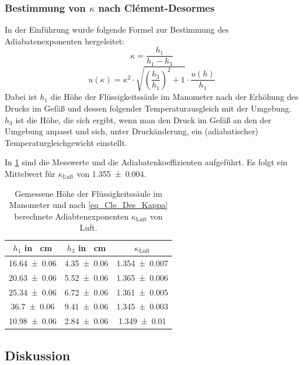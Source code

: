 \documentclass[
	a4paper,
	12pt,
	pagesize,
	ngerman
]{scrartcl}
\begin{document}
	
	
	\subsubsection{Bestimmung von $\kappa$ nach Clément-Desormes}
	In der Einführung wurde folgende Formel zur Bestimmung des Adiabatenexponenten hergeleitet:
	\begin{equation}
		\kappa = \frac{h_1}{h_1-h_3}
		\label{eq_Cle_Des_Kappa}
	\end{equation}
	\begin{equation}	
		u(\kappa) = \kappa^2\cdot \sqrt{\left(\frac{h_3}{h_1}\right)^2+1} \cdot \frac{u(h)}{h_1}
	\end{equation}
	Dabei ist $h_1$ die Höhe der Flüssigkeitssäule im Manometer nach der Erhöhung des Drucks im Gefäß und dessen folgender Temperaturausgleich mit der Umgebung. 
	$h_3$ ist die Höhe, die sich ergibt, wenn man den Druck im Gefäß an den der Umgebung anpasst und sich, unter Druckänderung, ein (adiabatischer) Temperaturgleichgewicht einstellt.
	
	In \cref{tab_Manometer} sind die Messwerte und die Adiabatenkoeffizienten aufgeführt. Es folgt ein Mittelwert für $\kappa_\text{Luft}$ von \SI{1,355+-0,004}{}.
	\begin{table}[H]
		\centering
		\begin{tabular}{ c | c | c }
			$h_1$ in \SI{}{cm} & $h_3$ in \SI{}{cm}  & $\kappa_\text{Luft}$\\ \hline
			\SI{16,64+-0,06}{}&\SI{4,35+-0,06}{} & \SI{1,354+-0,007}{}\\
			\SI{20,63+-0,06}{}&\SI{5,52+-0,06}{}& \SI{1,365+-0,006}{}\\
			\SI{25,34+-0,06}{}&\SI{6,72+-0,06}{}& \SI{1,361+-0,005}{}\\
			\SI{36,7+-0,06}{}&\SI{9,41+-0,06}{}& \SI{1,345+-0,003}{}\\
			\SI{10,98+-0,06}{}&\SI{2,84+-0,06}{}& \SI{1,349+-0,01}{}\\
		\end{tabular}
		\caption{Gemessene Höhe der Flüssigkeitssäule im Manometer und nach \cref{eq_Cle_Des_Kappa} berechnete Adiabtenexponenten $\kappa_\text{Luft}$ von Luft.}
		\label{tab_Manometer} 
	\end{table}
	\subsection{Diskussion}
	
\end{document}
